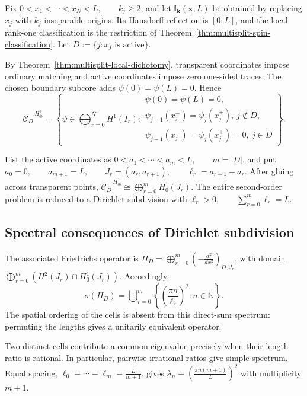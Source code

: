 \documentclass[11pt]{article}
\theoremstyle{plain}
\theoremstyle{definition}
\begin{document}
Fix
\(0<x_1<\cdots<x_N<L, \qquad k_j\geq2\),
and let \(\mathbb I_{\mathbf k}(\mathbf x;L)\) be obtained by replacing \(x_j\) with \(k_j\) inseparable origins. Its
Hausdorff reflection is \([0,L]\), and the local rank-one classification is
the restriction of
Theorem~\ref{thm:multisplit-spin-classification}. Let
\(D := \{j:x_j\text{ is active}\}\).

By Theorem~\ref{thm:multisplit-local-dichotomy}, transparent coordinates
impose ordinary matching and active coordinates impose zero one-sided
traces. The chosen boundary subcore adds
\(\psi(0)=\psi(L)=0\).
Hence
\[
  \overline{\mathcal C_D}^{\,H^1_\oplus}
  =
  \left\{
    \psi\in\bigoplus_{r=0}^{N}H^1(I_r):
    \begin{array}{l}
      \psi(0)=\psi(L)=0,\\
      \psi_{j-1}(x_j^-)=\psi_j(x_j^+),\ j\notin D,\\
      \psi_{j-1}(x_j^-)=\psi_j(x_j^+)=0,\ j\in D
    \end{array}
  \right\}.
\]

List the active coordinates as
\(0<a_1<\cdots<a_m<L, \qquad m=|D|\),
and put
\(a_0=0, \qquad a_{m+1}=L, \qquad J_r=(a_r,a_{r+1}), \qquad \ell_r=a_{r+1}-a_r\).
After gluing across transparent points,
\(\overline{\mathcal C_D}^{\,H^1_\oplus} \cong \bigoplus_{r=0}^{m}H^1_0(J_r)\).
The entire second-order problem is reduced to a Dirichlet subdivision
with
\(\ell_r>0, \qquad \sum_{r=0}^{m}\ell_r=L\).

\subsection{Spectral consequences of Dirichlet subdivision}
\label{subsec:multiinterval-spectrum}

The associated Friedrichs operator is
\(H_D = \bigoplus_{r=0}^{m} \left( -\frac{d^2}{dx^2} \right)_{D,J_r}\),
with domain
\(\bigoplus_{r=0}^{m} \left( H^2(J_r)\cap H^1_0(J_r) \right)\).
Accordingly,
\[
  \sigma(H_D)
  =
  \biguplus_{r=0}^{m}
  \left\{
    \left(
      \frac{\pi n}{\ell_r}
    \right)^2:
    n\in\mathbb N
  \right\}.
\]
The spatial ordering of the cells is absent from this direct-sum spectrum:
permuting the lengths gives a unitarily equivalent operator.

Two distinct cells contribute a common eigenvalue precisely when their
length ratio is rational. In particular, pairwise irrational ratios give
simple spectrum. Equal spacing,
\(\ell_0=\cdots=\ell_m=\frac{L}{m+1}\),
gives \(\lambda_n = \left( \frac{\pi n(m+1)}{L} \right)^2\) with multiplicity \(m+1\).
\end{document}
